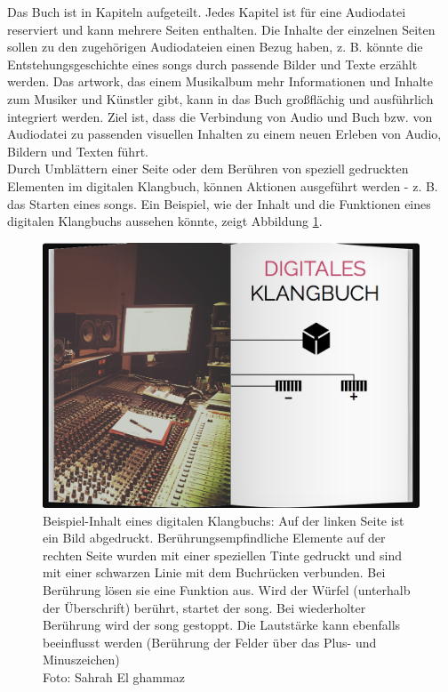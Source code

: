 Das Buch ist in Kapiteln aufgeteilt. Jedes Kapitel ist für eine Audiodatei reserviert und kann mehrere Seiten enthalten. Die Inhalte der einzelnen Seiten sollen zu den zugehörigen Audiodateien einen Bezug haben, z. B. könnte die Entstehungsgeschichte eines \gls{song}s durch passende Bilder und Texte erzählt werden. Das \gls{artwork}, das einem Musikalbum mehr Informationen und Inhalte zum Musiker und Künstler gibt, kann in das Buch großflächig und ausführlich integriert werden. Ziel ist, dass die Verbindung von Audio und Buch bzw. von Audiodatei zu passenden visuellen Inhalten zu einem neuen Erleben von Audio, Bildern und Texten führt.\\ 
Durch Umblättern einer Seite oder dem Berühren von speziell gedruckten Elementen im digitalen Klangbuch, können Aktionen ausgeführt werden - z. B. das Starten eines \gls{song}s. Ein Beispiel, wie der Inhalt und die Funktionen eines digitalen Klangbuchs aussehen könnte, zeigt Abbildung \ref{fig:klangbuch1}.


\begin{figure}[H]
\centering
\includegraphics[width=1.0\textwidth]{grafiken/bsplinien.png}
\caption{Beispiel-Inhalt eines digitalen Klangbuchs: Auf der linken Seite ist ein Bild abgedruckt. Berührungsempfindliche Elemente auf der rechten Seite wurden mit einer speziellen Tinte gedruckt und sind mit einer schwarzen Linie mit dem Buchrücken verbunden. Bei Berührung lösen sie eine Funktion aus. Wird der Würfel (unterhalb der Überschrift) berührt, startet der \gls{song}. Bei wiederholter Berührung wird der \gls{song} gestoppt. Die Lautstärke kann ebenfalls beeinflusst werden (Berührung der Felder über das Plus- und Minuszeichen)\\Foto: Sahrah El ghammaz}
\label{fig:klangbuch1}
\end{figure}

